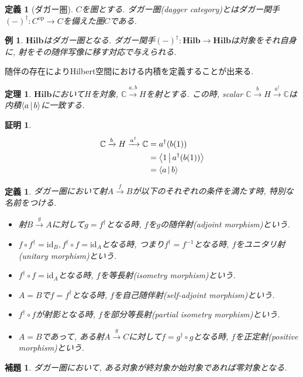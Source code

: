 \documentclass[a4paper,12pt]{ltjsarticle}
\theoremstyle{break}
\newtheorem{defn}[thm]{定義}
\newtheorem{lem}[thm]{補題}
\newtheorem{thrm}[thm]{定理}
\newtheorem{eg}[thm]{例}
\newtheorem*{prf}{証明}
\newcommand{\hilb}{\mathbf{Hilb}}
\newcommand{\mbc}{\mathbb{C}}
\newcommand{\Op}{\mathrm{op}}
\newcommand{\xr}[1]{\xrightarrow{#1}}
\newcommand{\id}{\mathrm{id}}
\newcommand{\ci}{\circ}
\newcommand{\da}{\dagger}
\numberwithin{equation}{section}
\begin{document}
\begin{defn}[ダガー圏]
  $C$を圏とする. 
  ダガー圏(dagger category)とはダガー関手$(-)^\da: C^{\Op} \to C$を備えた圏$C$である. 
\end{defn} 

\begin{eg}
  $\hilb$はダガー圏となる. 
  ダガー関手$(-)^\da: \hilb \to \hilb$は対象をそれ自身に, 射をその随伴写像に移す対応で与えられる. 
\end{eg}

随伴の存在によりHilbert空間における内積を定義することが出来る. 

\begin{thrm}
  $\hilb$において$H$を対象, $\mbc \xr{a,b} H$を射とする. この時, scalar $\mbc \xr{b} H \xr{a^\da} \mbc$は内積$\Braket{a|b}$に一致する. 
\end{thrm}

\begin{prf}
  \begin{align*}
    \mbc \xr{b} H \xr{a^\da} \mbc
    &= a^\da(b(1)) \\
    &= \Braket{1|a^\da(b(1))} \\
    &= \Braket{a|b}
  \end{align*}
\end{prf}

\begin{defn}
  ダガー圏において射$A \xr{f} B$が以下のそれぞれの条件を満たす時, 特別な名前をつける.
  \begin{itemize}
    \item 射$B \xr{g} A$に対して$g=f^\da$となる時, $f$を$g$の随伴射(adjoint morphism)という. 
    \item $f \ci f^\da = \id_B, f^\da \ci f = \id_A$となる時, つまり$f^\da=f^{-1}$となる時, $f$をユニタリ射(unitary morphism)という. 
    \item $f^\da \ci f = \id_A$となる時, $f$を等長射(isometry morphism)という.
    \item $A=B$で$f=f^\da$となる時, $f$を自己随伴射(self-adjoint morphism)という. 
    \item $f^\da \circ f$が射影となる時, $f$を部分等長射(partial isometry morphism)という. 
    \item $A=B$であって, ある射$A \xr{g} C$に対して$f=g^\da \ci g$となる時, $f$を正定射(positive morphism)という. 
  \end{itemize}
\end{defn} 

\begin{lem}
  ダガー圏において, ある対象が終対象か始対象であれば零対象となる. 
\end{lem}
\end{document}
